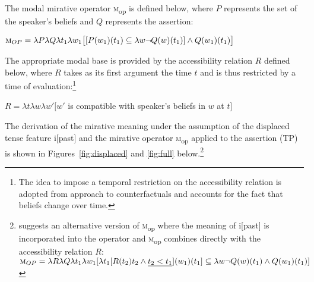 \documentclass[output=paper]{langscibook}
\begin{document}
The modal mirative operator \textsc{m}\textsubscript{op} is defined below, where $P$ represents the set of the speaker's beliefs and $Q$ represents the assertion:

\ea\label{def:M}
 $\textsc{m}_{OP}=\lambda P \lambda Q \lambda t_1 \lambda w_1 \big[[P(w_1)(t_1) \subseteq \lambda w \neg Q(w)(t_1)] \wedge Q(w_1)(t_1)\big]$ \\ \hfill \citep[54]{Bustamante2013}
\z

\noindent The appropriate modal base is provided by the accessibility relation $R$ defined below, where $R$ takes as its first argument the time $t$ and is thus restricted by a time of evaluation:\footnote{The idea to impose a temporal restriction on the accessibility relation is adopted from  approach to counterfactuals and accounts for the fact that beliefs change over time.}


\ea\label{def:R}
$R=\lambda t \lambda w \lambda w' [w'$ is compatible with speaker's beliefs in $w$ at $t]$
\z

\noindent The derivation of the mirative meaning under the assumption of the displaced tense feature i[past] and the mirative operator \textsc{m}\textsubscript{op} applied to the assertion (TP) is shown in Figures~\ref{fig:displaced} and \ref{fig:full} below.\footnote{\citet[61--62]{Bustamante2013} suggests an alternative version of \textsc{m}\textsubscript{op} where the meaning of i[past] is incorporated into the operator and \textsc{m}\textsubscript{op} combines directly with the accessibility relation $R$: \\
\ea
$\textsc{m}_{OP}=\lambda R \lambda Q \lambda t_1 \lambda w_1 [\lambda t_1 [R(t_2) t_2 \wedge \underline{t_2 < t_1}] (w_1)(t_1] \subseteq \lambda w \neg Q(w)(t_1) \wedge Q(w_1)(t_1)]$\\
\z}
\end{document}
